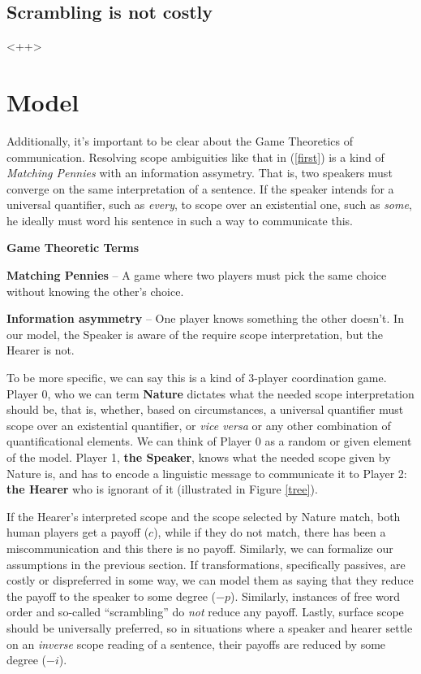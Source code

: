 \documentclass{article}
\begin{document}
\subsection{Scrambling is not costly}

<++>

\section{Model}

Additionally, it's important to be clear about the Game Theoretics of communication.
Resolving scope ambiguities like that in (\ref{first}) is a kind of \emph{Matching Pennies} with an information assymetry.
That is, two speakers must converge on the same interpretation of a sentence.
If the speaker intends for a universal quantifier, such as \emph{every}, to scope over an existential one, such as \emph{some}, he ideally must word his sentence in such a way to communicate this.

\begin{framed}
	\small

	\textbf{Game Theoretic Terms}

	\textbf{Matching Pennies} -- A game where two players must pick the same choice without knowing the other's choice.

	\textbf{Information asymmetry} -- One player knows something the other doesn't. In our model, the Speaker is aware of the require scope interpretation, but the Hearer is not.
\end{framed}

To be more specific, we can say this is a kind of 3-player coordination game.
Player 0, who we can term \textbf{Nature} dictates what the needed scope interpretation should be, that is, whether, based on circumstances, a universal quantifier must scope over an existential quantifier, or \emph{vice versa} or any other combination of quantificational elements.
We can think of Player 0 as a random or given element of the model.
Player 1, \textbf{the Speaker}, knows what the needed scope given by Nature is, and has to encode a linguistic message to communicate it to Player 2: \textbf{the Hearer} who is ignorant of it (illustrated in Figure \ref{tree}).

If the Hearer's interpreted scope and the scope selected by Nature match, both human players get a payoff ($c$), while if they do not match, there has been a miscommunication and this there is no payoff.
Similarly, we can formalize our assumptions in the previous section.
If transformations, specifically passives, are costly or dispreferred in some way, we can model them as saying that they reduce the payoff to the speaker to some degree ($-p$).
Similarly, instances of free word order and so-called ``scrambling'' do \emph{not} reduce any payoff.
Lastly, surface scope should be universally preferred, so in situations where a speaker and hearer settle on an \emph{inverse} scope reading of a sentence, their payoffs are reduced by some degree ($-i$).
\end{document}
